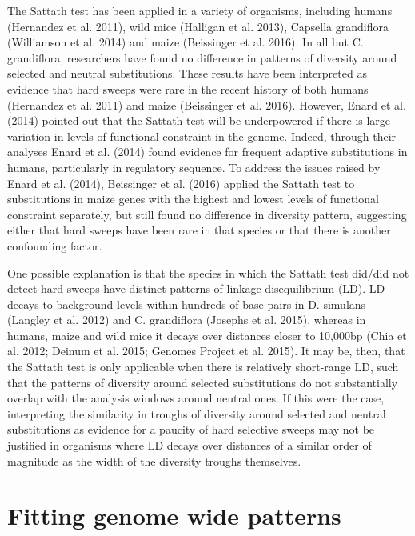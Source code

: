 The Sattath test has been applied in a variety of organisms, including humans (Hernandez et al. 2011), wild mice (Halligan et al. 2013), Capsella grandiflora (Williamson et al. 2014) and maize (Beissinger et al. 2016). In all but C. grandiflora, researchers have found no difference in patterns of diversity around selected and neutral substitutions. These results have been interpreted as evidence that hard sweeps were rare in the recent history of both humans (Hernandez et al. 2011) and maize (Beissinger et al. 2016). However, Enard et al. (2014) pointed out that the Sattath test will be underpowered if there is large variation in levels of functional constraint in the genome. Indeed, through their analyses Enard et al. (2014) found evidence for frequent adaptive substitutions in humans, particularly in regulatory sequence. To address the issues raised by Enard et al. (2014), Beissinger et al. (2016) applied the Sattath test to substitutions in maize genes with the highest and lowest levels of functional constraint separately, but still found no difference in diversity pattern, suggesting either that hard sweeps have been rare in that species or that there is another confounding factor.
 
One possible explanation is that the species in which the Sattath test did/did not detect hard sweeps have distinct patterns of linkage disequilibrium (LD). LD decays to background levels within hundreds of base-pairs in D. simulans (Langley et al. 2012) and C. grandiflora (Josephs et al. 2015), whereas in humans, maize and wild mice it decays over distances closer to 10,000bp (Chia et al. 2012; Deinum et al. 2015; Genomes Project et al. 2015). It may be, then, that the Sattath test is only applicable when there is relatively short-range LD, such that the patterns of diversity around selected substitutions do not substantially overlap with the analysis windows around neutral ones. If this were the case, interpreting the similarity in troughs of diversity around selected and neutral substitutions as evidence for a paucity of hard selective sweeps may not be justified in organisms where LD decays over distances of a similar order of magnitude as the width of the diversity troughs themselves.
   	        	  
\section{Fitting genome wide patterns}

